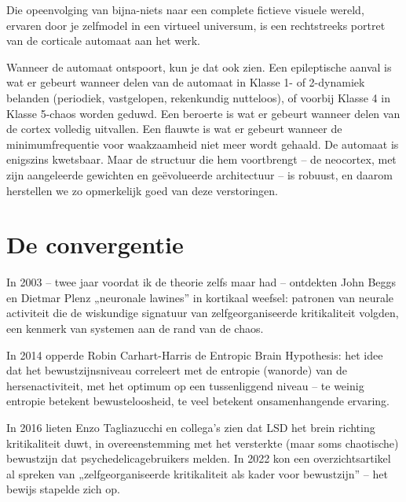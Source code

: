\documentclass[11pt, twoside, openright]{book}
\begin{document}
Die opeenvolging van bijna-niets naar een complete fictieve visuele wereld, ervaren door je zelfmodel in een virtueel universum, is een rechtstreeks portret van de corticale automaat aan het werk.

Wanneer de automaat ontspoort, kun je dat ook zien. Een epileptische aanval is wat er gebeurt wanneer delen van de automaat in Klasse 1- of 2-dynamiek belanden (periodiek, vastgelopen, rekenkundig nutteloos), of voorbij Klasse 4 in Klasse 5-chaos worden geduwd. Een beroerte is wat er gebeurt wanneer delen van de cortex volledig uitvallen. Een flauwte is wat er gebeurt wanneer de minimumfrequentie voor waakzaamheid niet meer wordt gehaald. De automaat is enigszins kwetsbaar. Maar de structuur die hem voortbrengt -- de neocortex, met zijn aangeleerde gewichten en geëvolueerde architectuur -- is robuust, en daarom herstellen we zo opmerkelijk goed van deze verstoringen.

\section*{De convergentie}

In 2003 -- twee jaar voordat ik de theorie zelfs maar had -- ontdekten John Beggs en Dietmar Plenz „neuronale lawines” in kortikaal weefsel: patronen van neurale activiteit die de wiskundige signatuur van zelfgeorganiseerde kritikaliteit volgden, een kenmerk van systemen aan de rand van de chaos.

In 2014 opperde Robin Carhart-Harris de Entropic Brain Hypothesis: het idee dat het bewustzijnsniveau correleert met de entropie (wanorde) van de hersenactiviteit, met het optimum op een tussenliggend niveau -- te weinig entropie betekent bewusteloosheid, te veel betekent onsamenhangende ervaring.

In 2016 lieten Enzo Tagliazucchi en collega's zien dat LSD het brein richting kritikaliteit duwt, in overeenstemming met het versterkte (maar soms chaotische) bewustzijn dat psychedelicagebruikers melden. In 2022 kon een overzichtsartikel al spreken van „zelfgeorganiseerde kritikaliteit als kader voor bewustzijn” -- het bewijs stapelde zich op.
\end{document}
